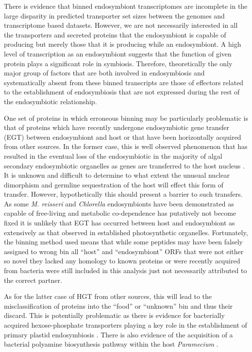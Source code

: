 There is evidence that binned endosymbiont transcriptomes are incomplete in the large
disparity in predicted transporter set sizes between the genomes and transcriptome
based datasets.  However,
we are not necessarily interested in all the transporters and secreted proteins
that the endosymbiont is capable of producing but merely those that it is producing
while an endosymbiont. 
A high level of transcription as an endosymbiont
suggests that the function of given protein plays a significant role in symbiosis.
Therefore, theoretically the only major group of factors that are both
involved in endosymbiosis and systematically absent from these binned
transcripts are those of effectors related to the establishment of endosymbiosis
that are not expressed during the rest of the endosymbiotic relationship.


One set of proteins in which erroneous binning may be particularly
problematic is that of proteins which have recently undergone endosymbiotic
gene transfer (EGT) between endosymbiont and host \citep{Timmis2004} or that have been horizontally
acquired from other sources.  In the former case,
this is well observed phenomenon that has resulted in the eventual loss
of the endosymbiotic in the majority of algal secondary endosymbiotic organelles
as genes are transferred to the host nucleus
\citep{Keeling2008a,Archibald2005,Timmis2004,Keeling2004a}.
It is unknown and difficult to determine to what extent the 
unusual nuclear dimorphism and germline sequestration of the host 
will effect this form of transfer. However, hypothetically this should
present a barrier to such transfers. 
As some \textit{M. reisseri} and \textit{Chlorella} endosymbionts 
have been demonstrated as capable of free-living and metabolic
co-dependence has putatively not become fixed it is 
unlikely that EGT has occurred between host and endosymbiont as extensively
as that observed in established photosynthetic organelles. 
Fortunately, the binning method used means that while some peptides
may have been falsely assigned to wrong bin all ``host'' and
``endosymbiont'' ORFs that were not either so novel they lacked
any homology to known proteins or were recently acquired from
bacteria were still included in this analysis just not necessarily
attributed to the correct partner.

As for the latter case of HGT from other sources, this will lead to the misclassification
of proteins into the ``food'' or ``unknown'' bin and thus their discard. 
This is potentially problematic as there is evidence for bacterially acquired 
hexose-phosphate transporters playing a key role in the 
establishment of primary plastid endosymbiosis \citep{Price2012,Karkar2015a}.
There is also evidence of the acquisition of a bacterial polyamine
biosynthesis pathway within the host \textit{Paramecium} \citep{Li2015b}.


